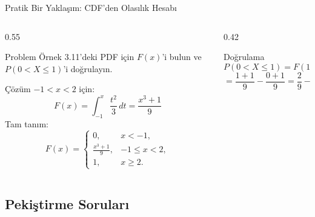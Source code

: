 \documentclass[light]{lutbeamer}
\begin{document}
\begin{frame}{Pratik Bir Yaklaşım: CDF'den Olasılık Hesabı}
\footnotesize
\begin{columns}[T]
  \begin{column}{0.55\textwidth}
    \begin{block}{Problem}
      Örnek 3.11'deki PDF için $F(x)$'i bulun ve $P(0 < X \le 1)$'i doğrulayın.
    \end{block}
    \begin{alertblock}{Çözüm}
      $-1 < x < 2$ için:
      \[
      F(x) = \int_{-1}^{x} \frac{t^2}{3}\,dt = \frac{x^3 + 1}{9}
      \]
      Tam tanım:
      \[
      F(x) =
      \begin{cases}
        0, & x < -1,\\
        \frac{x^3+1}{9}, & -1 \le x < 2,\\
        1, & x \ge 2.
      \end{cases}
      \]
    \end{alertblock}
  \end{column}
  \begin{column}{0.42\textwidth}
    \begin{block}{Doğrulama}
      \[
      P(0 < X \le 1) = F(1) - F(0)
      \]
      \[
      = \frac{1+1}{9} - \frac{0+1}{9} = \frac{2}{9} - \frac{1}{9} = \frac{1}{9} \;\checkmark
      \]
    \end{block}
    \centering
  \end{column}
\end{columns}
\end{frame}

\subsection{Pekiştirme Soruları}
\end{document}
